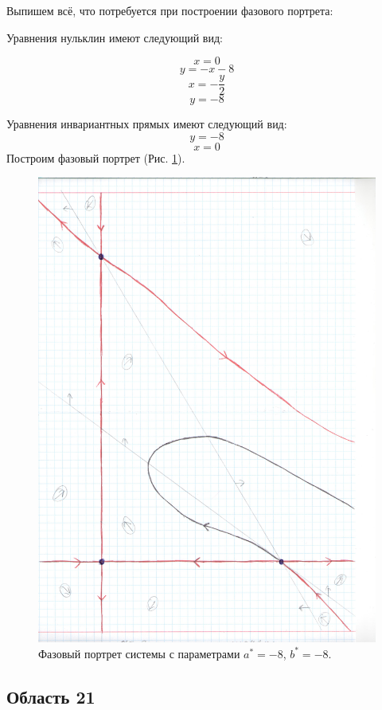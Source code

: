 Выпишем всё, что потребуется при построении фазового портрета:

Уравнения нульклин имеют следующий вид: 

$$x=0$$
$$y=- x - 8$$
$$x=- \frac{y}{2}$$
$$y=-8$$


Уравнения инвариантных прямых имеют следующий вид: 
$$y = -8$$
$$x = 0$$
Построим фазовый портрет (Рис. \ref{fig:phportr20}).

\begin{figure}[h]
	
	\includegraphics[width=\textwidth]{phptr/(-8, -4).jpg}
	\centering
	\caption{\label{fig:phportr20} Фазовый портрет системы с параметрами $a^\ast = -8$, $b^\ast = -8$.}
	
\end{figure}

\subsection{Область 21}

